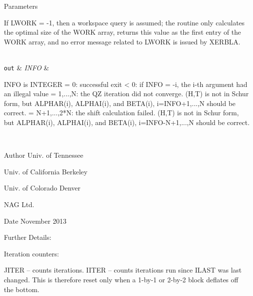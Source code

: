\begin{DoxyParams}[1]{Parameters}
\begin{DoxyVerb}
          If LWORK = -1, then a workspace query is assumed; the routine
          only calculates the optimal size of the WORK array, returns
          this value as the first entry of the WORK array, and no error
          message related to LWORK is issued by XERBLA.\end{DoxyVerb}
\\
\hline
\mbox{\tt out}  & {\em I\+N\+F\+O} & \begin{DoxyVerb}          INFO is INTEGER
          = 0: successful exit
          < 0: if INFO = -i, the i-th argument had an illegal value
          = 1,...,N: the QZ iteration did not converge.  (H,T) is not
                     in Schur form, but ALPHAR(i), ALPHAI(i), and
                     BETA(i), i=INFO+1,...,N should be correct.
          = N+1,...,2*N: the shift calculation failed.  (H,T) is not
                     in Schur form, but ALPHAR(i), ALPHAI(i), and
                     BETA(i), i=INFO-N+1,...,N should be correct.\end{DoxyVerb}
 \\
\hline
\end{DoxyParams}
\begin{DoxyAuthor}{Author}
Univ. of Tennessee 

Univ. of California Berkeley 

Univ. of Colorado Denver 

N\+A\+G Ltd. 
\end{DoxyAuthor}
\begin{DoxyDate}{Date}
November 2013 
\end{DoxyDate}
\begin{DoxyParagraph}{Further Details\+: }
\begin{DoxyVerb}  Iteration counters:

  JITER  -- counts iterations.
  IITER  -- counts iterations run since ILAST was last
            changed.  This is therefore reset only when a 1-by-1 or
            2-by-2 block deflates off the bottom.\end{DoxyVerb}
 
\end{DoxyParagraph}
\hypertarget{group__doubleGEcomputational_gac150eadbadeb706cda2998e2bb0a70dd}{}
